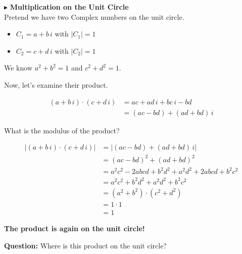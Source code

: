 \documentclass{ximera}
\begin{document}
$\blacktriangleright$ \textbf{\textcolor{blue!75!black}{Multiplication on the Unit Circle}}  \\


Pretend we have two Complex numbers on the unit circle.

\begin{itemize}
\item $C_1 = a + b \, i$ with $|C_1| = 1$
\item $C_2 = c + d \, i$ with $|C_2| = 1$
\end{itemize}



We know $a^2 + b^2 = 1$  and $c^2 + d^2 = 1$.



Now, let's examine their product.






\begin{align*}
(a + b \, i) \cdot (c + d \, i)      & = ac + ad \, i + bc \, i - bd   \\
                & = (ac - bd) + (ad + bd) \, i
\end{align*}



What is the modulus of the product?





\begin{align*}
|(a + b \, i) \cdot (c + d \, i)|      & = | (ac - bd) + (ad + bd) \, i | \\
                & = (ac - bd)^2 + (ad + bd)^2   \\
                & = a^2c^2 - 2abcd + b^2d^2 + a^2d^2 + 2abcd + b^2c^2  \\
                & = a^2c^2 + b^2d^2 + a^2d^2 + b^2c^2  \\
                & = (a^2 + b^2) \cdot (c^2 + d^2)   \\
                & = 1 \cdot 1  \\
                & = 1
\end{align*}



\textbf{\textcolor{purple!85!blue}{The product is again on the unit circle!}}





\textbf{Question:} Where is this product on the unit circle?
\end{document}
